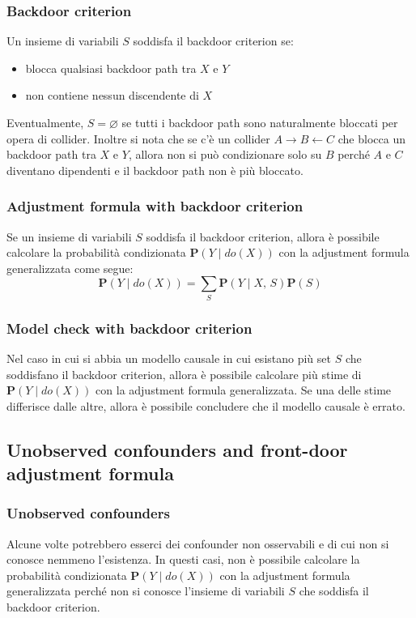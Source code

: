 \subsubsection*{Backdoor criterion}
Un insieme di variabili \(S\) soddisfa il backdoor criterion se:
\begin{itemize}
	\item blocca qualsiasi backdoor path tra \(X\) e \(Y\)
	\item non contiene nessun discendente di \(X\)
\end{itemize}
Eventualmente, \(S = \varnothing\) se tutti i backdoor path sono naturalmente bloccati per opera di collider. Inoltre si nota
che se c'è un collider \(A \to B \leftarrow C\) che blocca un backdoor path tra \(X\) e \(Y\), allora non si può condizionare
solo su \(B\) perché \(A\) e \(C\) diventano dipendenti e il backdoor path non è più bloccato.

\subsubsection*{Adjustment formula with backdoor criterion}
Se un insieme di variabili \(S\) soddisfa il backdoor criterion, allora è possibile calcolare la probabilità condizionata
\(\textbf{P}(Y \mid do(X))\) con la adjustment formula generalizzata come segue:
\[\textbf{P}(Y \mid do(X)) = \sum_{S} \textbf{P}(Y \mid X, \, S) \textbf{P}(S)\]

\subsubsection*{Model check with backdoor criterion}
Nel caso in cui si abbia un modello causale in cui esistano più set \(S\) che soddisfano il backdoor criterion, allora è
possibile calcolare più stime di \(\textbf{P}(Y \mid do(X))\) con la adjustment formula generalizzata. Se una delle stime
differisce dalle altre, allora è possibile concludere che il modello causale è errato.

\subsection{Unobserved confounders and front-door adjustment formula}
\subsubsection*{Unobserved confounders}
Alcune volte potrebbero esserci dei confounder non osservabili e di cui non si conosce nemmeno l'esistenza. In questi casi,
non è possibile calcolare la probabilità condizionata \(\textbf{P}(Y \mid do(X))\) con la adjustment formula generalizzata
perché non si conosce l'insieme di variabili \(S\) che soddisfa il backdoor criterion.

